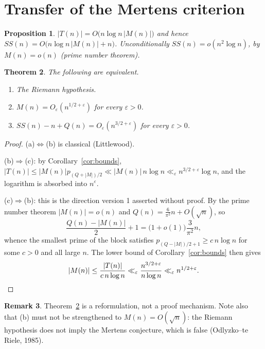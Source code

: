 \documentclass[11pt]{amsart}
\newtheorem{theorem}{Theorem}[section]
\newtheorem{proposition}[theorem]{Proposition}
\theoremstyle{definition}
\newtheorem{remark}[theorem]{Remark}
\newcommand{\Mert}{M}
\newcommand{\Sq}{Q}
\begin{document}
\section{Transfer of the Mertens criterion}

\begin{proposition}
$|T(n)|=O\bigl(n\log n\,|\Mert(n)|\bigr)$ and hence
$SS(n)=O\bigl(n\log n\,|\Mert(n)|+n\bigr)$. Unconditionally
$SS(n)=o(n^2\log n)$, by $\Mert(n)=o(n)$ (prime number theorem).
\end{proposition}

\begin{theorem}\label{thm:RH}
The following are equivalent.
\begin{enumerate}[label=(\alph*)]
\item The Riemann hypothesis.
\item $\Mert(n)=O_\varepsilon(n^{1/2+\varepsilon})$ for every $\varepsilon>0$.
\item $SS(n)-n+\Sq(n)=O_\varepsilon(n^{3/2+\varepsilon})$ for every
$\varepsilon>0$.
\end{enumerate}
\end{theorem}

\begin{proof}
(a)$\iff$(b) is classical (Littlewood).

(b)$\Rightarrow$(c): by Corollary~\ref{cor:bounds},
$|T(n)|\le|\Mert(n)|p_{(\Sq+|\Mert|)/2}\ll |\Mert(n)|\,n\log n
\ll_\varepsilon n^{3/2+\varepsilon}\log n$, and the logarithm is absorbed into
$n^{\varepsilon}$.

(c)$\Rightarrow$(b): this is the direction version 1 asserted without proof. By
the prime number theorem $|\Mert(n)|=o(n)$ and $\Sq(n)=\tfrac6{\pi^2}n+O(\sqrt
n)$, so
\[
\frac{\Sq(n)-|\Mert(n)|}{2}+1=\bigl(1+o(1)\bigr)\frac{3}{\pi^2}n ,
\]
whence the smallest prime of the block satisfies
$p_{(\Sq-|\Mert|)/2+1}\ge c\,n\log n$ for some $c>0$ and all large $n$. The
lower bound of Corollary~\ref{cor:bounds} then gives
\[
|\Mert(n)|\le \frac{|T(n)|}{c\,n\log n}
\ll_\varepsilon \frac{n^{3/2+\varepsilon}}{n\log n}
\ll_\varepsilon n^{1/2+\varepsilon}. \qedhere
\]
\end{proof}

\begin{remark}
Theorem~\ref{thm:RH} is a reformulation, not a proof mechanism. Note also that
(b) must not be strengthened to $\Mert(n)=O(\sqrt n)$: the Riemann hypothesis
does not imply the Mertens conjecture, which is false (Odlyzko--te Riele, 1985).
\end{remark}
\end{document}
